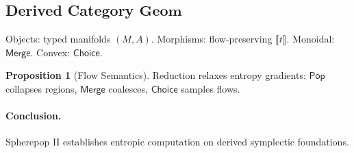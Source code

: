\documentclass[12pt]{article}
\newcommand{\Pop}{\mathsf{Pop}}
\newcommand{\Merge}{\mathsf{Merge}}
\newcommand{\Choice}{\mathsf{Choice}}
\newcommand{\Interp}[1]{\llbracket #1 \rrbracket}
\theoremstyle{definition}
\newtheorem{proposition}{Proposition}
\begin{document}
\subsection{Derived Category $\mathbf{Geom}$}
Objects: typed manifolds $(M,A)$. Morphisms: flow-preserving $\Interp{t}$. Monoidal: $\Merge$. Convex: $\Choice$.

\begin{proposition}[Flow Semantics]
Reduction relaxes entropy gradients: $\Pop$ collapses regions, $\Merge$ coalesces, $\Choice$ samples flows.
\end{proposition}

\paragraph{Conclusion.} Spherepop II establishes entropic computation on derived symplectic foundations.

\end{document}
